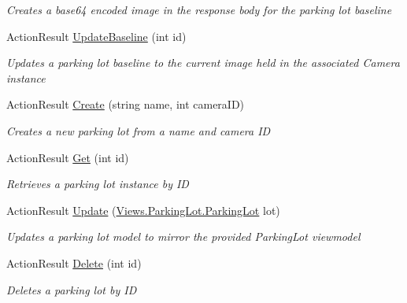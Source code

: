 \begin{DoxyCompactItemize}
\begin{DoxyCompactList}\small\item\em Creates a base64 encoded image in the response body for the parking lot baseline \end{DoxyCompactList}\item 
Action\+Result \mbox{\hyperlink{class_eagle_eye_1_1_controllers_1_1_parking_lot_controller_a073d77794ca654b813b37deae908501a}{Update\+Baseline}} (int id)
\begin{DoxyCompactList}\small\item\em Updates a parking lot baseline to the current image held in the associated Camera instance \end{DoxyCompactList}\item 
Action\+Result \mbox{\hyperlink{class_eagle_eye_1_1_controllers_1_1_parking_lot_controller_a5af6a4b208418bca8a26f30255c62926}{Create}} (string name, int camera\+ID)
\begin{DoxyCompactList}\small\item\em Creates a new parking lot from a name and camera ID \end{DoxyCompactList}\item 
Action\+Result \mbox{\hyperlink{class_eagle_eye_1_1_controllers_1_1_parking_lot_controller_ab3bd9c4d1c40c73a214475198aa74039}{Get}} (int id)
\begin{DoxyCompactList}\small\item\em Retrieves a parking lot instance by ID \end{DoxyCompactList}\item 
Action\+Result \mbox{\hyperlink{class_eagle_eye_1_1_controllers_1_1_parking_lot_controller_aa0484b67b0469d5c81421d793405ac50}{Update}} (\mbox{\hyperlink{class_eagle_eye_1_1_views_1_1_parking_lot_1_1_parking_lot}{Views.\+Parking\+Lot.\+Parking\+Lot}} lot)
\begin{DoxyCompactList}\small\item\em Updates a parking lot model to mirror the provided Parking\+Lot viewmodel \end{DoxyCompactList}\item 
Action\+Result \mbox{\hyperlink{class_eagle_eye_1_1_controllers_1_1_parking_lot_controller_aa26300d7c8f2fa2e41c15ceb0eb5c79e}{Delete}} (int id)
\begin{DoxyCompactList}\small\item\em Deletes a parking lot by ID \end{DoxyCompactList}\end{DoxyCompactItemize}


